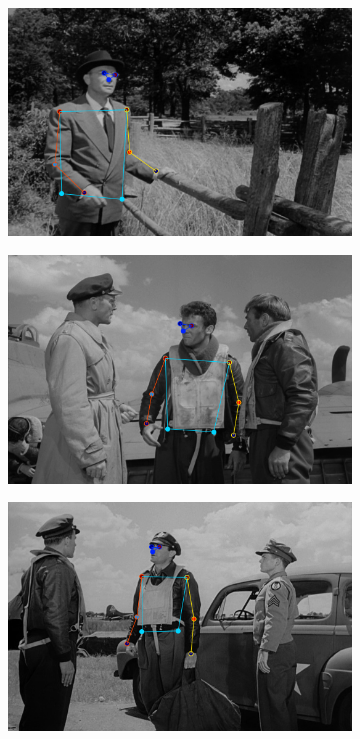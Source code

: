 \begin{figure}[t!]
\begin{subfigure}[b]{0.115\textwidth}
    \end{subfigure}
    \\
    \begin{subfigure}[b]{0.115\textwidth}
            \includegraphics[width=\textwidth]{resources/MotivativeAnnotation/FLIC/bad_anno-1}
    \end{subfigure}
    \hfill
    \begin{subfigure}[b]{0.115\textwidth}
            \includegraphics[width=\textwidth]{resources/MotivativeAnnotation/FLIC/bad_anno-2}
    \end{subfigure}
  	\hfill
    \begin{subfigure}[b]{0.115\textwidth}
            \includegraphics[width=\textwidth]{resources/MotivativeAnnotation/FLIC/bad_anno-3}

\end{subfigure}
\end{figure}
